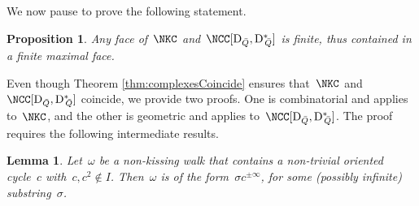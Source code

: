 \documentclass{amsart}
\newtheorem{proposition}[theorem]{Proposition}
\newtheorem{lemma}[theorem]{Lemma}
\theoremstyle{definition}
\newcommand{\dual}{^*} %
\newcommand{\dissection}{\mathrm{D}} %
\begin{document}
We now pause to prove the following statement.

\begin{proposition}
\label{prop:facetsAreFinite}
Any face of~$\NKC$ and~$\NCC[\dissection_{\bar Q}, {\dissection\dual\!\!_{\bar Q}}]$ is finite, thus contained in a finite maximal face.
\end{proposition}

Even though Theorem \ref{thm:complexesCoincide} ensures that~$\NKC$ and~$\NCC[\dissection_{\bar Q}, {\dissection\dual\!\!_{\bar Q}}]$ coincide, we provide two proofs.
One is combinatorial and applies to~$\NKC$, and the other is geometric and applies to~$\NCC[\dissection_{\bar Q}, {\dissection\dual\!\!_{\bar Q}}]$.
The proof requires the following intermediate results.

\begin{lemma}
\label{lem:nkCycles}
Let~$\omega$ be a non-kissing walk that contains a non-trivial oriented cycle~$c$ with~$c, c^2\notin I$.
Then~$\omega$ is of the form~$\sigma c^{\pm\infty}$, for some (possibly infinite) substring~$\sigma$.
\end{lemma}
\end{document}
